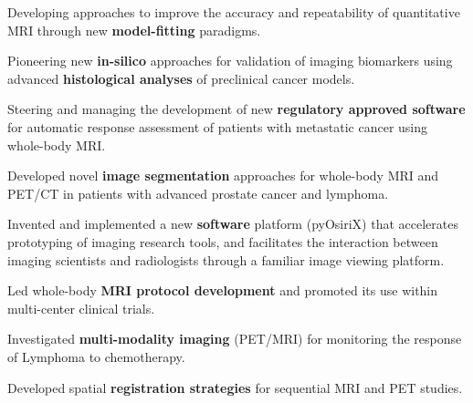 \documentclass[]{mbcv}
\begin{document}
\begin{minipage}[t]{0.65\textwidth}
\begin{tightemize}
\item Developing approaches to improve the accuracy and repeatability of quantitative MRI through new \textbf{model-fitting} paradigms.

\item Pioneering new \textbf{in-silico} approaches for validation of imaging biomarkers using advanced \textbf{histological analyses} of preclinical cancer models.

\item Steering and managing the development of new \textbf{regulatory approved software} for automatic response assessment of patients with metastatic cancer using whole-body MRI.

\item Developed novel \textbf{image segmentation} approaches for whole-body MRI and PET/CT in patients with advanced prostate cancer and lymphoma.

\item Invented and implemented a new \textbf{software} platform (pyOsiriX) that accelerates prototyping of imaging research tools, and facilitates the interaction between imaging scientists and radiologists through a familiar image viewing platform.

\item Led whole-body \textbf{MRI protocol development} and promoted its use within multi-center clinical trials. 

\end{tightemize}

\sectionsep


\begin{tightemize}

\item Investigated \textbf{multi-modality imaging} (PET/MRI) for monitoring the response of Lymphoma to chemotherapy.

\item Developed spatial \textbf{registration strategies} for sequential MRI and PET studies.

\end{tightemize}

\sectionsep

\end{minipage}
\end{document}

